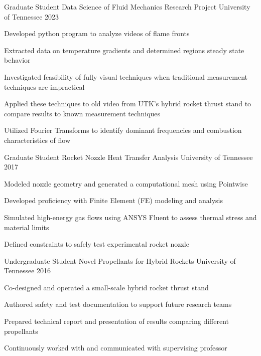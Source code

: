 
\begin{cventries}
  \cventry
    {Graduate Student}
    {Data Science of Fluid Mechanics Research Project} %
    {University of Tennessee} %
    {2023} %
    {
      \begin{cvitems} %
        \item {Developed python program to analyze videos of flame fronts}
        \item {Extracted data on temperature gradients and determined regions steady state behavior}
        \item {Investigated feasibility of fully visual techniques when traditional measurement techniques are impractical}
        \item {Applied these techniques to old video from UTK's hybrid rocket thrust stand to compare results to known measurement techniques}
        \item {Utilized Fourier Transforms to identify dominant frequencies and combustion characteristics of flow}
      \end{cvitems}
    }

  \cventry
    {Graduate Student}
    {Rocket Nozzle Heat Transfer Analysis} %
    {University of Tennessee} %
    {2017} %
    {
      \begin{cvitems} %
        \item {Modeled nozzle geometry and generated a computational mesh using Pointwise}
        \item {Developed proficiency with Finite Element (FE) modeling and analysis}
        \item {Simulated high-energy gas flows using ANSYS Fluent to assess thermal stress and material limits}
        \item {Defined constraints to safely test experimental rocket nozzle}
      \end{cvitems}
    }

  \cventry
    {Undergraduate Student}
    {Novel Propellants for Hybrid Rockets} %
    {University of Tennessee} %
    {2016} %
    {
      \begin{cvitems} %
        \item {Co-designed and operated a small-scale hybrid rocket thrust stand}
		    \item {Authored safety and test documentation to support future research teams}
		    \item {Prepared technical report and presentation of results comparing different propellants}
		    \item {Continuously worked with and communicated with supervising professor}
      \end{cvitems}
    }

\end{cventries}